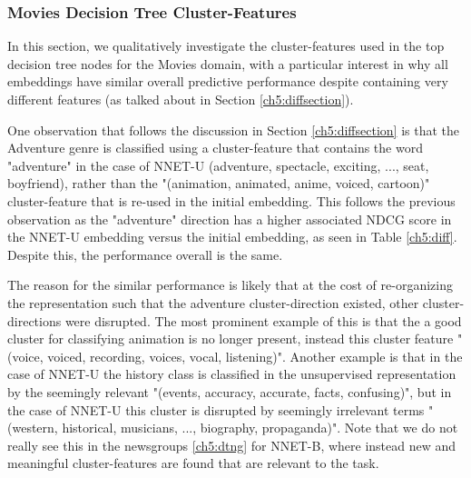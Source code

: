 \subsubsection{Movies Decision Tree Cluster-Features}\label{ch5:cluster-features}

In this section, we qualitatively investigate the cluster-features used in the top decision tree nodes for the Movies domain, with a particular interest in why all embeddings have similar overall predictive performance despite containing very different features (as talked about in Section \ref{ch5:diffsection}).

One observation that follows the discussion in Section \ref{ch5:diffsection} is that the Adventure genre is classified using a cluster-feature that contains the word "adventure" in the case of NNET-U (adventure, spectacle, exciting, ..., seat, boyfriend), rather than the "(animation, animated, anime, voiced, cartoon)" cluster-feature that is re-used in the initial embedding. This follows the previous observation as the "adventure" direction has a higher associated NDCG score in the NNET-U embedding versus the initial embedding, as seen in Table \ref{ch5:diff}. Despite this, the performance overall is the same. 

The reason for the similar performance is likely that at the cost of re-organizing the representation such that the adventure cluster-direction existed, other cluster-directions were disrupted. The most prominent example of this is that the a good cluster for classifying animation is no longer present, instead this  cluster feature "(voice, voiced, recording, voices, vocal, listening)". Another example is that in the case of NNET-U the history class is classified in the unsupervised representation by the seemingly relevant "(events, accuracy, accurate, facts, confusing)", but in the case of NNET-U this cluster is disrupted by seemingly irrelevant terms "(western, historical, musicians, ..., biography, propaganda)". Note that we do not really see this in the newsgroups  \ref{ch5:dtng} for NNET-B, where instead new and meaningful cluster-features are found that are relevant to the task.


